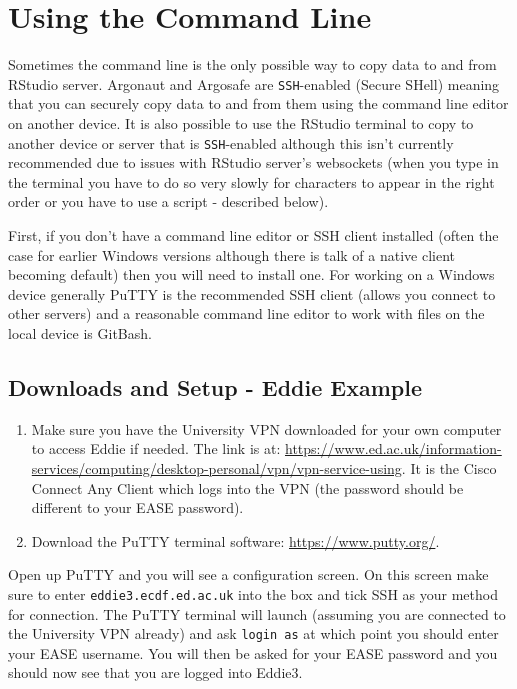 \documentclass[]{book}
\providecommand{\tightlist}{%
  \setlength{\itemsep}{0pt}\setlength{\parskip}{0pt}}
\begin{document}
\hypertarget{using-the-command-line}{%
\section{Using the Command Line}\label{using-the-command-line}}

Sometimes the command line is the only possible way to copy data to and from RStudio server. Argonaut and Argosafe are \texttt{SSH}-enabled (Secure SHell) meaning that you can securely copy data to and from them using the command line editor on another device. It is also possible to use the RStudio terminal to copy to another device or server that is \texttt{SSH}-enabled although this isn't currently recommended due to issues with RStudio server's websockets (when you type in the terminal you have to do so very slowly for characters to appear in the right order or you have to use a script - described below).

First, if you don't have a command line editor or SSH client installed (often the case for earlier Windows versions although there is talk of a native client becoming default) then you will need to install one. For working on a Windows device generally PuTTY is the recommended SSH client (allows you connect to other servers) and a reasonable command line editor to work with files on the local device is GitBash.

\hypertarget{downloads-and-setup---eddie-example}{%
\subsection{Downloads and Setup - Eddie Example}\label{downloads-and-setup---eddie-example}}

\begin{enumerate}
\def\labelenumi{\arabic{enumi}.}
\tightlist
\item
  Make sure you have the University VPN downloaded for your own computer to access Eddie if needed. The link is at: \url{https://www.ed.ac.uk/information-services/computing/desktop-personal/vpn/vpn-service-using}. It is the Cisco Connect Any Client which logs into the VPN (the password should be different to your EASE password).\\
\item
  Download the PuTTY terminal software: \url{https://www.putty.org/}.
\end{enumerate}

Open up PuTTY and you will see a configuration screen. On this screen make sure to enter \texttt{eddie3.ecdf.ed.ac.uk} into the box and tick SSH as your method for connection. The PuTTY terminal will launch (assuming you are connected to the University VPN already) and ask \texttt{login\ as} at which point you should enter your EASE username. You will then be asked for your EASE password and you should now see that you are logged into Eddie3.
\end{document}
